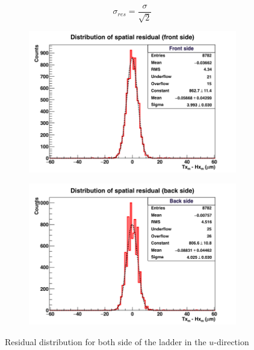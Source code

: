     \begin{equation}
      \sigma_{res} = \frac{\sigma}{\sqrt{2}}
    \end{equation}

    \begin{figure}[!h]
      \centering
      \begin{subfigure}[t]{0.45\textwidth}
        \centering
        \includegraphics[width = 1.2\textwidth]{Pictures/deformation/hxtxFront_226056.png}
      \end{subfigure}
      \quad
      \begin{subfigure}[t]{0.45\textwidth}
        \centering
        \includegraphics[width = 1.2\textwidth]{Pictures/deformation/hxtxBack_226056.png}
      \end{subfigure}
      \caption{Residual distribution for both side of the ladder in the $u$-direction}
      \label{fig:residualFrontBackLadder}
    \end{figure}

